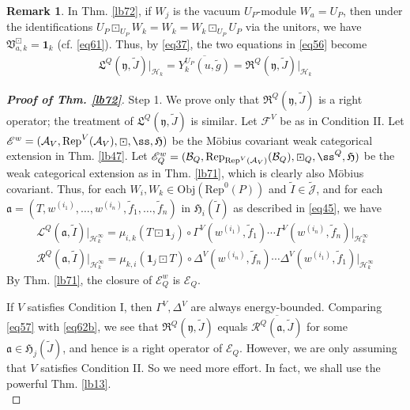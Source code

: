 \documentclass[11pt,b5paper,notitlepage]{article}
\theoremstyle{definition}
\newtheorem{rem}[df]{Remark}
\theoremstyle{plain}
\newcommand{\fk}{\mathfrak}
\newcommand{\mc}{\mathcal}
\newcommand{\wtd}{\widetilde}
\newcommand{\ovl}{\overline}
\newcommand{\idt}{\mathbf{1}}
\newcommand{\Rep}{\mathrm{Rep}}
\newcommand{\scr}{\mathscr}
\newcommand{\Jtd}{\widetilde{\mathcal J}}
\newcommand{\yk}{\mathfrak y}
\newcommand{\Obj}{\mathrm{Obj}}
\numberwithin{equation}{section}
\begin{document}
\begin{rem}\label{lb76}
In Thm. \ref{lb72}, if $W_j$ is the vacuum $U_P$-module $W_a=U_P$, then under the identifications $U_P\boxdot_{U_P} W_k=W_k=W_k\boxdot_{U_P}U_P$ via the unitors, we have $\fk V_{a,k}^\boxdot=\idt_k$ (cf. \eqref{eq61}). Thus, by \eqref{eq37}, the two equations in \eqref{eq56} become
\begin{align}
\fk L^Q(\yk,\wtd J)\big|_{\mc H_k}=\ovl{Y^{U_P}_k(u,\wtd g)}=\fk R^Q(\yk,\wtd J)\big|_{\mc H_k}
\end{align}
\end{rem}





\begin{proof}[\textbf{Proof of Thm. \ref{lb72}}]
Step 1. We prove only that $\fk R^Q(\yk,\wtd J)$ is a right operator; the treatment of $\fk L^Q(\yk,\wtd J)$ is similar. Let $\mc F^V$ be as in Condition II. Let $\scr E^w=(\mc A_V,\Rep^V(\mc A_V),\boxdot,\ss,\fk H)$ be the M\"obius covariant weak categorical extension in Thm. \ref{lb47}. Let $\scr E_Q^w=(\mc B_Q,\Rep_{\Rep^V(\mc A_V)}(\mc B_Q),\boxdot_Q,\ss^Q,\fk H)$ be the weak categorical extension as in Thm. \ref{lb71}, which is clearly also M\"obius covariant. Thus, for each $W_i,W_k\in\Obj(\Rep^0(P))$ and $\wtd I\in\Jtd$, and for each $\fk a=(T,w^{(i_1)},\dots,w^{(i_n)},\wtd f_1,\dots,\wtd f_n)$ in $\fk H_i(\wtd I)$ as described in \eqref{eq45}, we have 
\begin{subequations}\label{eq62}
\begin{gather}
\mc L^Q(\fk a,\wtd I)\big|_{\mc H_k^\infty}=\mu_{i,k}(T\boxdot\idt_j)\circ \Gamma^V(w^{(i_1)},\wtd f_1)\cdots \Gamma^V(w^{(i_n)},\wtd f_n)\big|_{\mc H_k^\infty}\label{eq62a}\\
\mc R^Q(\fk a,\wtd I)\big|_{\mc H_k^\infty}=\mu_{k,i}(\idt_j\boxdot T)\circ \Delta^V(w^{(i_n)},\wtd f_n)\cdots \Delta^V(w^{(i_1)},\wtd f_1)\big|_{\mc H_k^\infty}\label{eq62b}
\end{gather}
\end{subequations}
By Thm. \ref{lb71}, the closure of $\scr E^w_Q$ is $\scr E_Q$.

If $V$ satisfies Condition I, then $\Gamma^V,\Delta^V$ are always energy-bounded. Comparing \eqref{eq57} with \eqref{eq62b}, we see that $\fk R^Q(\yk,\wtd J)$ equals $\ovl{\mc R^Q(\fk a,\wtd J)}$ for some $\fk a\in\fk H_j(\wtd J)$, and hence is a right operator of $\scr E_Q$. However, we are only assuming that $V$ satisfies Condition II. So we need more effort. In fact, we shall use the powerful Thm. \ref{lb13}. \\[-1ex]


\end{proof}
\end{document}
